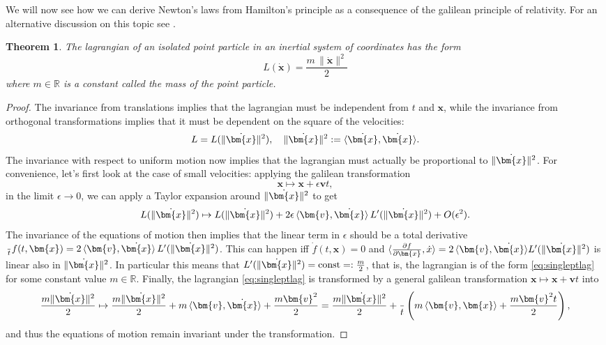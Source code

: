 \documentclass[english,fontsize=11pt,paper=a5,oneside]{scrbook}
\newcommand{\R}{\mathbb{R}}
\newcommand{\bx}{\bm{x}}
\newcommand{\lag}{\langle}
\newcommand{\rag}{\rangle}
\let\d\relax
\newcommand{\d}{\mathrm{d}}
\newtheorem{theorem}{Theorem}[chapter]
\theoremstyle{definition}
\begin{document}
We will now see how we can derive Newton's laws from Hamilton's principle as a consequence of the galilean principle of relativity. For an alternative discussion on this topic see \cite[Chapters 1.1 and 1.2]{book:arnold}.

\begin{theorem}
  The lagrangian of an isolated point particle in an inertial system of coordinates has the form
  \begin{equation}\label{eq:singleptlag}
    L(\dot{\bm{x}}) = \frac{m\,\|\dot{\bm{x}}\|^2}2
  \end{equation}
  where $m\in\R$ is a constant called the \emph{mass} of the point particle.
\end{theorem}
\begin{proof}
  The invariance from translations implies that the lagrangian must be independent from $t$ and $\bx$, while the invariance from orthogonal transformations implies that it must be dependent on the square of the velocities:
  \begin{equation}
    L = L(\|\dot\bx\|^2), \quad \|\dot\bx\|^2 := \lag\dot \bx, \dot \bx\rag.
  \end{equation}
  The invariance with respect to uniform motion now implies that the lagrangian must actually be proportional to $\|\dot\bx\|^2$.
  For convenience, let's first look at the case of small velocities: applying the galilean transformation
  \begin{equation}
    \bx \mapsto \bx + \epsilon \bm{v}t,
  \end{equation}
  in the limit $\epsilon \to 0$, we can apply a Taylor expansion around $\|\dot\bx\|^2$ to get
  \begin{equation}
    L(\|\dot\bx\|^2) \mapsto L(\|\dot\bx\|^2) + 2\epsilon\,\lag\bm{v}, \dot\bx\rag\,L'(\|\dot\bx\|^2) + O(\epsilon^2).
  \end{equation}
  The invariance of the equations of motion then implies that the linear term in $\epsilon$ should be a total derivative $\frac{\d }{\d t} f(t, \bx) = 2\,\lag\bm{v}, \dot\bx\rag\,L'(\|\dot\bx\|^2)$.
  This can happen iff $\dot f(t, \bx) = 0$ and $\lag \frac{\partial f}{\partial \bx}, \dot x\rag  = 2\,\lag\bm{v}, \dot\bx\rag L'(\|\dot\bx\|^2)$ is linear also in $\|\dot\bx\|^2$.
  In particular this means that $L'(\|\dot\bx\|^2) = \mathrm{const} =: \frac{m}2$, that is, the lagrangian is of the form \eqref{eq:singleptlag} for some constant value $m\in\R$.
  Finally, the lagrangian \eqref{eq:singleptlag} is transformed by a general galilean transformation $\bx \mapsto \bx + \bm{v}t$ into
  \begin{equation}
    \frac{m \|\dot\bx\|^2}2 \mapsto
    \frac{m \|\dot\bx\|^2}2 + m\,\lag\bm{v},\dot\bx\rag + \frac{m \bm{v}^2}2
    = \frac{m \|\dot\bx\|^2}2 + \frac{\d }{\d t}\left(m\,\lag\bm{v},\bx\rag + \frac{m \bm{v}^2 t}2\right),
  \end{equation}
  and thus the equations of motion remain invariant under the transformation.
\end{proof}
\end{document}
